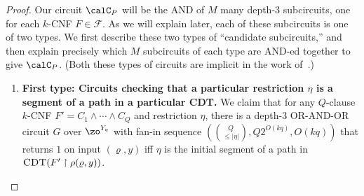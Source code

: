 \documentclass{toc}
\theoremstyle{plain}
\newcommand{\uhr}{\upharpoonright}
\newcommand{\CDT}{\textsc{CDT}}
\begin{document}
\begin{proof}
Our circuit $\calC_P$ will be the AND of $M$ many depth-$3$ subcircuits, one for each $k$-CNF $F \in \mathscr{F}$. As we will explain later, each of these subcircuits is one of two types. We first describe these two types of ``candidate subcircuits,'' and then explain precisely which $M$ subcircuits of each type are AND-ed together to give $\calC_P$. (Both these types of circuits are implicit in the work of~\cite{TX13}.) 

\begin{enumerate}

\item {\bf First type: Circuits  checking that a particular restriction $\eta$ is a segment of a path in a particular CDT.}  We claim that for any $Q$-clause $k$-CNF $F' = C_1 \wedge \cdots \wedge C_Q$ and restriction $\eta$, there is a depth-$3$ OR-AND-OR circuit $G$ over $\zo^{Y_q}$ with fan-in sequence $({Q\choose \le|\eta|}, Q2^{O(kq)},O(kq))$ that returns $1$ on input $(\varrho,y)$ iff $\eta$ is the initial segment of a path in $\CDT(F' \uhr \rho(\varrho,y))$. 


\end{enumerate}
\end{proof}
\end{document}

